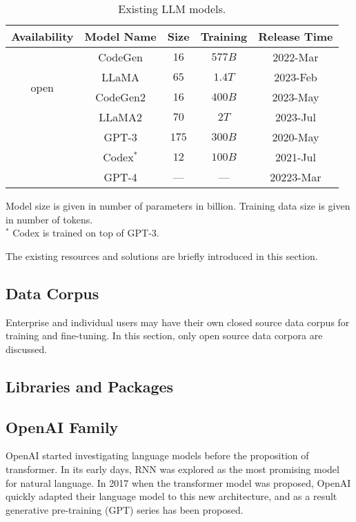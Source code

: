 \begin{table}
	\centering \caption{Existing LLM models.}\label{ch:llm:tab:existingmodel}
	\begin{tabular}{ccccc}
		\hline
		Availability & Model Name & Size & Training & Release Time \\ \hline
		\multirow{4}{*}{open} & CodeGen & $16$ & $577B$ & 2022-Mar \\
		 & LLaMA & $65$ & $1.4T$ & 2023-Feb \\
		 & CodeGen2 & $16$ & $400B$ & 2023-May \\
		 & LLaMA2 & $70$ & $2T$ & 2023-Jul \\ \hdashline
		\multirow{3}{*}{closed} & GPT-3 & $175$ & $300B$ & 2020-May \\
		 & Codex$^*$ & $12$ & $100B$ & 2021-Jul \\
		 & GPT-4 & --- & --- & 20223-Mar \\
		\hline
	\end{tabular}
\begin{flushleft}
	\footnotesize
	Model size is given in number of parameters in billion. Training data size is given in number of tokens. \\
	$^*$ Codex is trained on top of GPT-3.
\end{flushleft}
\end{table}

The existing resources and solutions are briefly introduced in this section.

\subsection{Data Corpus}

Enterprise and individual users may have their own closed source data corpus for training and fine-tuning. In this section, only open source data corpora are discussed.

\subsection{Libraries and Packages}

\subsection{OpenAI Family}

OpenAI started investigating language models before the proposition of transformer. In its early days, RNN was explored as the most promising model for natural language. In 2017 when the transformer model was proposed, OpenAI quickly adapted their language model to this new architecture, and as a result generative pre-training (GPT) series has been proposed.

